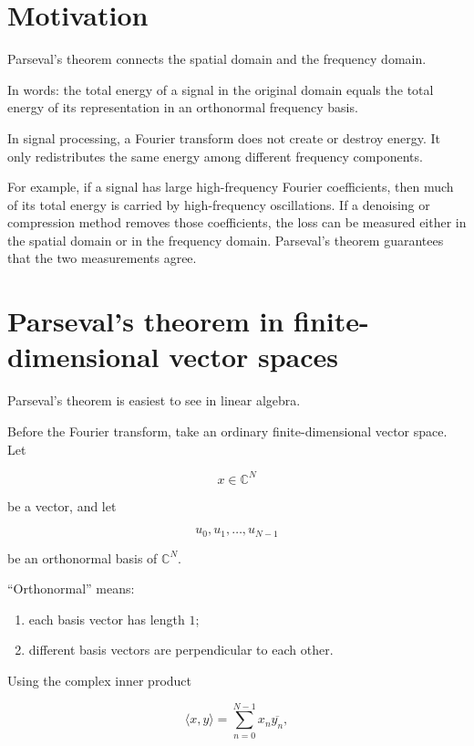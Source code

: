 \section{Motivation}

Parseval’s theorem connects the spatial domain and the frequency domain.

In words: the total energy of a signal in the original domain equals the total energy of its representation in an orthonormal frequency basis.

In signal processing, a Fourier transform does not create or destroy energy. It only redistributes the same energy among different frequency components.

For example, if a signal has large high-frequency Fourier coefficients, then much of its total energy is carried by high-frequency oscillations. If a denoising or compression method removes those coefficients, the loss can be measured either in the spatial domain or in the frequency domain. Parseval’s theorem guarantees that the two measurements agree.

\section{Parseval’s theorem in finite-dimensional vector spaces}

Parseval’s theorem is easiest to see in linear algebra.

Before the Fourier transform, take an ordinary finite-dimensional vector space. Let

\[
x \in \mathbb{C}^N
\]

be a vector, and let

\[
{u_0,u_1,\dots,u_{N-1}}
\]

be an orthonormal basis of \(\mathbb{C}^N\).

“Orthonormal” means:

\begin{enumerate}
  \item each basis vector has length \(1\);
  \item different basis vectors are perpendicular to each other.
\end{enumerate}

Using the complex inner product

\[
\langle x,y\rangle
=
\sum_{n=0}^{N-1}
x_n \overline{y_n},
\]

